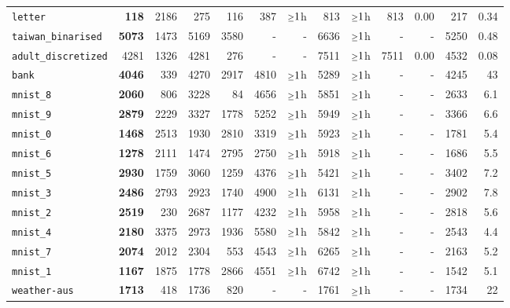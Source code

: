 \begin{tabular}{lrrrrrrrrrrrr}
\texttt{letter} & \textbf{118} & 2186 & 275 & 116 & 387 & $\mathsmaller{\geq}1$h & 813 & $\mathsmaller{\geq}1$h & 813 & 0.00 & 217 & 0.34\\
\texttt{taiwan\_binarised} & \textbf{5073} & 1473 & 5169 & 3580 & - & - & 6636 & $\mathsmaller{\geq}1$h & - & - & 5250 & 0.48\\
\texttt{adult\_discretized} & 4281 & 1326 & 4281 & 276 & - & - & 7511 & $\mathsmaller{\geq}1$h & 7511 & 0.00 & 4532 & 0.08\\
\texttt{bank} & \textbf{4046} & 339 & 4270 & 2917 & 4810 & $\mathsmaller{\geq}1$h & 5289 & $\mathsmaller{\geq}1$h & - & - & 4245 & 43\\
\texttt{mnist\_8} & \textbf{2060} & 806 & 3228 & 84 & 4656 & $\mathsmaller{\geq}1$h & 5851 & $\mathsmaller{\geq}1$h & - & - & 2633 & 6.1\\
\texttt{mnist\_9} & \textbf{2879} & 2229 & 3327 & 1778 & 5252 & $\mathsmaller{\geq}1$h & 5949 & $\mathsmaller{\geq}1$h & - & - & 3366 & 6.6\\
\texttt{mnist\_0} & \textbf{1468} & 2513 & 1930 & 2810 & 3319 & $\mathsmaller{\geq}1$h & 5923 & $\mathsmaller{\geq}1$h & - & - & 1781 & 5.4\\
\texttt{mnist\_6} & \textbf{1278} & 2111 & 1474 & 2795 & 2750 & $\mathsmaller{\geq}1$h & 5918 & $\mathsmaller{\geq}1$h & - & - & 1686 & 5.5\\
\texttt{mnist\_5} & \textbf{2930} & 1759 & 3060 & 1259 & 4376 & $\mathsmaller{\geq}1$h & 5421 & $\mathsmaller{\geq}1$h & - & - & 3402 & 7.2\\
\texttt{mnist\_3} & \textbf{2486} & 2793 & 2923 & 1740 & 4900 & $\mathsmaller{\geq}1$h & 6131 & $\mathsmaller{\geq}1$h & - & - & 2902 & 7.8\\
\texttt{mnist\_2} & \textbf{2519} & 230 & 2687 & 1177 & 4232 & $\mathsmaller{\geq}1$h & 5958 & $\mathsmaller{\geq}1$h & - & - & 2818 & 5.6\\
\texttt{mnist\_4} & \textbf{2180} & 3375 & 2973 & 1936 & 5580 & $\mathsmaller{\geq}1$h & 5842 & $\mathsmaller{\geq}1$h & - & - & 2543 & 4.4\\
\texttt{mnist\_7} & \textbf{2074} & 2012 & 2304 & 553 & 4543 & $\mathsmaller{\geq}1$h & 6265 & $\mathsmaller{\geq}1$h & - & - & 2163 & 5.2\\
\texttt{mnist\_1} & \textbf{1167} & 1875 & 1778 & 2866 & 4551 & $\mathsmaller{\geq}1$h & 6742 & $\mathsmaller{\geq}1$h & - & - & 1542 & 5.1\\
\texttt{weather-aus} & \textbf{1713} & 418 & 1736 & 820 & - & - & 1761 & $\mathsmaller{\geq}1$h & - & - & 1734 & 22\\
\bottomrule
\end{tabular}
